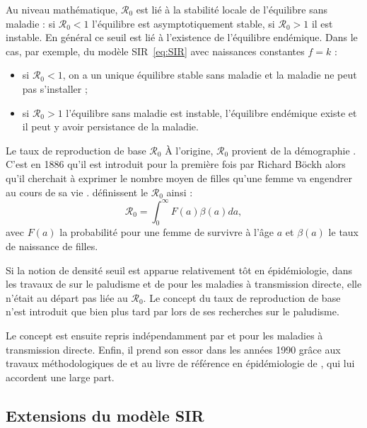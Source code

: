 	Au niveau mathématique, $\mathscr{R}_0$ est lié à la stabilité locale de l'équilibre sans maladie : si $\mathscr{R}_0<1$ l'équilibre est asymptotiquement stable, si $\mathscr{R}_0>1$ il est instable.
En général ce seuil est lié à l'existence de l'équilibre endémique. Dans le cas, par exemple, du modèle SIR~\eqref{eq:SIR} avec naissances constantes $f=k$ :
\begin{itemize}
	\item si $\mathscr{R}_0<1$, on a un unique équilibre stable sans
	  maladie et la maladie ne peut pas s'installer ; 
	\item si $\mathscr{R}_0>1$ l'équilibre sans maladie est instable, l'équilibre endémique existe et il peut y avoir persistance de la maladie.
	\end{itemize}
	
\begin{encadre2}{Le taux de reproduction de base $\mathscr{R}_0$}
\label{encadre:R0}
 À l’origine,  $\mathscr{R}_0$ provient de la démographie \citep{Heesterbeek2002}. C’est en 1886 qu’il est introduit pour la première fois par Richard Böckh  alors qu’il cherchait à exprimer le nombre moyen de filles qu’une femme va engendrer au cours de sa vie \citep{Bockh1886}.
 \citet{Dublin1925}  définissent le $\mathscr{R}_0$ ainsi :
	  \begin{equation*}
	    \mathscr{R}_0= \int_{0}^{\infty} F(a)\beta(a) da,
	  \end{equation*}
 avec $F(a)$ la probabilité pour une femme de survivre à l’âge $a$ et $\beta(a)$ le taux de naissance de filles.
\par
Si la notion de densité seuil est apparue relativement tôt en épidémiologie, dans les travaux de \citet{Ross1911} sur le paludisme et de \citet{Kermack1927} pour les maladies à transmission directe, elle n’était au départ pas liée au $\mathscr{R}_0$. Le concept du taux de reproduction de base n’est introduit que bien plus tard  par \citet{Macdonald1952} lors de ses recherches sur le paludisme.
\par
Le concept est ensuite repris indépendamment par \citet{Dietz1975}  et \citet{Hethcote1975} pour les maladies à transmission directe. Enfin, il prend son essor dans les années 1990 grâce aux travaux méthodologiques de \citet{Diekmann1990} et au livre de référence en épidémiologie de \citet{Anderson1991}, qui lui accordent une large part.
\end{encadre2}
	
	
\subsection{Extensions du modèle SIR}
\label{sec:ext}
	 
